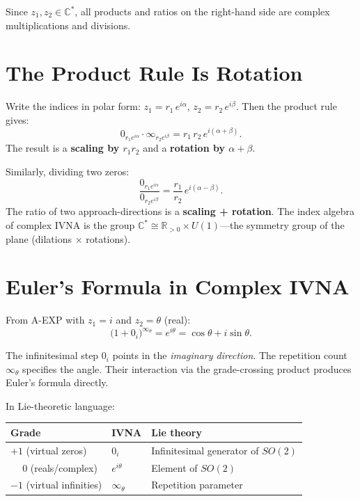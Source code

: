 \documentclass[11pt,a4paper]{article}
\newcommand{\vi}[1]{0_{#1}}          %
\newcommand{\vinf}[1]{\infty_{#1}}   %
\begin{document}
Since $z_1, z_2 \in \mathbb{C}^*$, all products and ratios on the right-hand side are complex multiplications and divisions.

\section{The Product Rule Is Rotation}

Write the indices in polar form: $z_1 = r_1\,e^{i\alpha}$, $z_2 = r_2\,e^{i\beta}$. Then the product rule gives:
\[
  \vi{r_1 e^{i\alpha}} \cdot \vinf{r_2 e^{i\beta}}
  = r_1\, r_2\, e^{i(\alpha + \beta)}.
\]
The result is a \textbf{scaling by $r_1 r_2$} and a \textbf{rotation by $\alpha + \beta$}.

Similarly, dividing two zeros:
\[
  \frac{\vi{r_1 e^{i\alpha}}}{\vi{r_2 e^{i\beta}}}
  = \frac{r_1}{r_2}\, e^{i(\alpha - \beta)}.
\]
The ratio of two approach-directions is a \textbf{scaling + rotation}. The index algebra of complex IVNA is the group $\mathbb{C}^* \cong \mathbb{R}_{>0} \times U(1)$---the symmetry group of the plane (dilations $\times$ rotations).

\section{Euler's Formula in Complex IVNA}

From A-EXP with $z_1 = i$ and $z_2 = \theta$ (real):
\[
  \bigl(1 + \vi{i}\bigr)^{\vinf{\theta}} = e^{i\theta} = \cos\theta + i\sin\theta.
\]

The infinitesimal step $\vi{i}$ points in the \emph{imaginary direction}. The repetition count $\vinf{\theta}$ specifies the angle. Their interaction via the grade-crossing product produces Euler's formula directly.

In Lie-theoretic language:
\begin{center}
\renewcommand{\arraystretch}{1.4}
\begin{tabular}{lll}
\textbf{Grade} & \textbf{IVNA} & \textbf{Lie theory} \\
\hline
$+1$ (virtual zeros) & $\vi{i}$ & Infinitesimal generator of $SO(2)$ \\
$\phantom{+}0$ (reals/complex) & $e^{i\theta}$ & Element of $SO(2)$ \\
$-1$ (virtual infinities) & $\vinf{\theta}$ & Repetition parameter \\
\end{tabular}
\end{center}
\end{document}
